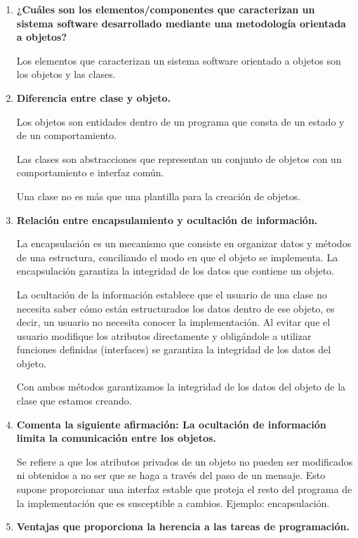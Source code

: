 \documentclass[12pt,letterpaper]{article}
\begin{document}
	\begin{enumerate}
		\item \textbf{¿Cuáles son los elementos/componentes que caracterizan un sistema software
		desarrollado mediante una metodología orientada a objetos?}
		
		Los elementos que caracterizan un sistema software orientado a objetos son los objetos	y las clases.
		
		\item \textbf{Diferencia entre clase y objeto.}
		
		Los objetos son entidades dentro de un programa que consta de un estado y de un comportamiento.
		
		Las clases son abstracciones que representan un conjunto de objetos con un comportamiento e interfaz común.
		
		Una clase no es más que una plantilla para la creación de objetos.
		
		\item \textbf{Relación entre encapsulamiento y ocultación de información.}
		
		La encapsulación es un mecanismo que consiste en organizar datos y métodos de una estructura, conciliando el modo en que el objeto se implementa. La encapsulación garantiza la integridad de los datos que contiene un objeto.
		
		La ocultación de la información establece que el usuario de una clase no necesita saber cómo están estructurados los datos dentro de ese objeto, es decir, un usuario no necesita
		conocer la implementación. Al evitar que el usuario modifique los atributos directamente y obligándole a utilizar funciones definidas (interfaces) se garantiza la
		integridad de los datos del objeto.
		
		Con ambos métodos garantizamos la integridad de los datos del objeto de la clase que estamos creando.
		
		\item \textbf{Comenta la siguiente afirmación: La ocultación de información limita la comunicación entre los objetos.}
		
		Se refiere a que los atributos privados de un objeto no pueden ser modificados ni obtenidos a no ser que se haga a través del paso de un mensaje. Esto supone proporcionar una interfaz estable que proteja el resto del programa de la
		implementación que es susceptible a cambios. Ejemplo: encapsulación.
		
		\item \textbf{Ventajas que proporciona la herencia a las tareas de programación.}
		

\end{enumerate}
\end{document}
